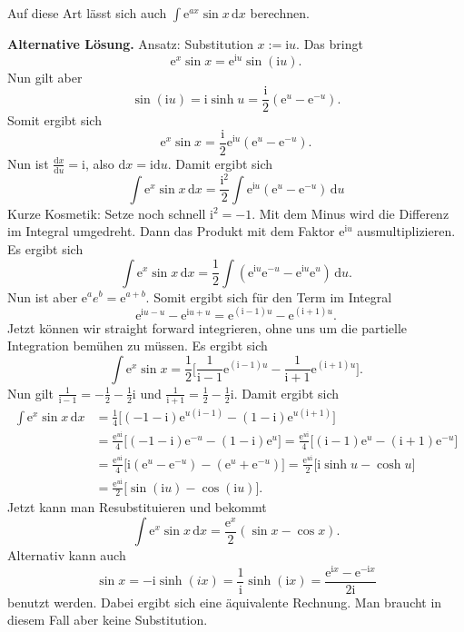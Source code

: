 \documentclass[a4paper,10pt,fleqn,twoside]{scrartcl}
\numberwithin{equation}{section}
\newcommand{\ui}{\mathrm i}
\newcommand{\ee}{\mathrm e}
\newcommand{\strong}[1]{{\normalfont\sffamily\bfseries #1}}
\theoremstyle{Aufgabe}
\begin{document}
Auf diese Art lässt sich auch $\displaystyle\int \ee^{ax}\sin x\,\mathrm dx$
berechnen.

\strong{Alternative Lösung.}
Ansatz: Substitution $x:=\ui u$. Das bringt
\begin{equation}
\ee^x\sin x = \ee^{\ui u}\sin(\ui u).
\end{equation}
Nun gilt aber
\begin{equation}
\sin(\ui u)=\ui\sinh u = \frac{\ui}{2}(\ee^u-\ee^{-u}).
\end{equation}
Somit ergibt sich
\begin{equation}
\ee^x\sin x = \frac{\ui}{2}\ee^{\ui u}(\ee^u-\ee^{-u}).
\end{equation}
Nun ist $\frac{\mathrm dx}{\mathrm du}=\ui$, also
$\mathrm dx=\ui\mathrm du$. Damit ergibt sich
\begin{equation}
\int \ee^x\sin x\,\mathrm dx
= \frac{\ui^2}{2}\int \ee^{\ui u}(\ee^u-\ee^{-u})\,\mathrm du
\end{equation}
Kurze Kosmetik: Setze noch schnell $\ui^2=-1$. Mit dem Minus wird
die Differenz im Integral umgedreht. Dann das Produkt mit dem
Faktor $\ee^{\ui u}$ ausmultiplizieren. Es ergibt sich
\begin{equation}
\int \ee^x\sin x\,\mathrm dx
= \frac{1}{2}\int (\ee^{\ui u}\ee^{-u}-\ee^{\ui u}\ee^u)\,\mathrm du.
\end{equation}
Nun ist aber $\ee^a e^b=\ee^{a+b}$. Somit ergibt sich
für den Term im Integral
\begin{equation}
\ee^{\ui u-u}-\ee^{\ui u+u} = \ee^{(\ui-1)u}-\ee^{(\ui+1)u}.
\end{equation}
Jetzt können wir straight forward integrieren, ohne uns um
die partielle Integration bemühen zu müssen. Es ergibt sich
\begin{equation}
\int \ee^x\sin x
= \frac{1}{2}\bigg[
\frac{1}{\ui-1}\ee^{(\ui-1)u}-\frac{1}{\ui+1}\ee^{(\ui+1)u}
\bigg].
\end{equation}
Nun gilt $\frac{1}{\ui-1}=-\frac{1}{2}-\frac{1}{2}\ui$ und
$\frac{1}{\ui+1} = \frac{1}{2}-\frac{1}{2}\ui$. Damit ergibt sich
\begin{align}
\int \ee^x\sin x\,\mathrm dx
&= \frac{1}{4}\Big[(-1-\ui)\ee^{u(\ui-1)}-(1-\ui)\ee^{u(\ui+1)}\Big]\\
&= \frac{\ee^{u\ui}}{4}\Big[(-1-\ui)\ee^{-u}-(1-\ui)\ee^u\Big]
= \frac{\ee^{u\ui}}{4}\Big[(\ui-1)\ee^u-(\ui+1)\ee^{-u}\Big]\\
&= \frac{\ee^{u\ui}}{4}\Big[\ui(\ee^u-\ee^{-u})-(\ee^u+\ee^{-u})\Big]
= \frac{\ee^{u\ui}}{2}\Big[\ui\sinh u-\cosh u\Big]\\
&= \frac{\ee^{u\ui}}{2}\Big[\sin(\ui u)-\cos(\ui u)\Big].
\end{align}
Jetzt kann man Resubstituieren und bekommt
\begin{equation}
\int \ee^x\sin x\,\mathrm dx = \frac{\ee^x}{2}(\sin x-\cos x).
\end{equation}
Alternativ kann auch
\begin{equation}
\sin x = -\ui\sinh(ix) = \frac{1}{\ui}\sinh(\ui x)
=\frac{\ee^{\ui x}-\ee^{-\ui x}}{2\ui}
\end{equation}
benutzt werden. Dabei ergibt sich eine äquivalente
Rechnung. Man braucht in diesem Fall aber keine Substitution.
\end{document}
